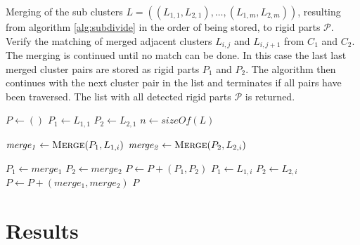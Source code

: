 \begin{algorithm}[tbp]
	\caption{Merging of the sub clusters $\mathit{L} = ((L_{1,1}, L_{2,1}),\ldots,(L_{1,m}, L_{2,m}))$, resulting from algorithm \ref{alg:subdivide} in the order of being stored, to rigid parts $\mathcal{P}$. Verify the matching of merged adjacent clusters $L_{i,j}$ and $L_{i,j+1}$ from $C_1$ and $C_2$. The merging is continued until no match can be done. In this case the last last merged cluster pairs are stored as rigid parts $P_1$ and $P_2$. The algorithm then continues with the next cluster pair in the list and terminates if all pairs have been traversed. The list with all detected rigid parts $\mathcal{P}$ is returned.}
	\label{alg:merging}
	
	\begin{algorithmic}[1]     %
		\label{merging}

		\State $P \gets ()$
		\State $P_1 \gets L_{1,1}$
		\State $P_2 \gets L_{2,1}$
		\State $n \gets \mathit{sizeOf}(L)$
		
		\State $\mathit{merge_1} \gets \Call{Merge}{P_1, L_{1,i}}$
		\State $\mathit{merge_2} \gets \Call{Merge}{P_2, L_{2,i}}$
		
		\State $\mathit{P_1} \gets merge_1$
		\State $\mathit{P_2} \gets merge_2$
		\Else
		\State $P \gets P + (P_1, P_2)$
		\State $P_1 \gets L_{1,i}$
		\State $P_2 \gets L_{2,i}$
		\EndIf
		\EndFor
		\State $P \gets P + (merge_1, merge_2)$
		\State\Return $P$
		\EndProcedure	
	\end{algorithmic}
\end{algorithm}

\section{Results}

